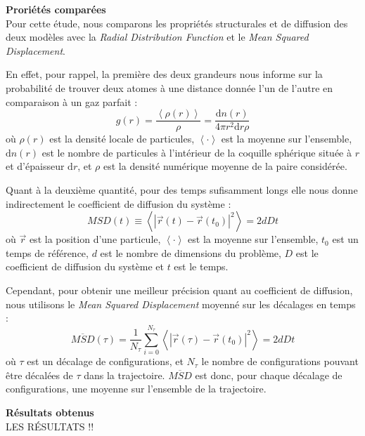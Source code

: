 \textbf{Proriétés comparées}\\
Pour cette étude, nous comparons les propriétés structurales et de diffusion des deux modèles avec la \emph{Radial Distribution Function} et le \emph{Mean Squared Displacement}.

En effet, pour rappel, la première des deux grandeurs nous informe sur la probabilité de trouver deux atomes à une distance donnée l'un de l'autre en comparaison à un gaz parfait :
\begin{equation}
    \boxed%
    {
        g (r) = \frac{\left\langle \rho (r) \right\rangle}{\rho} = \frac{\mathrm{d}n(r)}{4 \pi r^2 \mathrm{d}r \rho}
    }
    \label{eq:rdf}
\end{equation}
où $\rho (r)$ est la densité locale de particules, $\left\langle \cdot \right\rangle$ est la moyenne sur l'ensemble, $\mathrm{d}n(r)$ est le nombre de particules à l'intérieur de la coquille sphérique située à $r$ et d'épaisseur $\mathrm{d}r$, et $\rho$ est la densité numérique moyenne de la paire considérée.

Quant à la deuxième quantité, pour des temps sufisamment longs elle nous donne indirectement le coefficient de diffusion du système :
\begin{equation*}
    MSD(t) \equiv \left\langle \left| \vec{r}(t) - \vec{r}(t_0) \right|^2 \right\rangle = 2 d D t
\end{equation*}
où $\vec{r}$ est la position d'une particule, $\left\langle \cdot \right\rangle$ est la moyenne sur l'ensemble, $t_0$ est un temps de référence, $d$ est le nombre de dimensions du problème, $D$ est le coefficient de diffusion du système et $t$ est le temps.

Cependant, pour obtenir une meilleur précision quant au coefficient de diffusion, nous utilisons le \emph{Mean Squared Displacement} moyenné sur les décalages en temps :
\begin{equation}
    \boxed%
    {
        \overline{MSD} (\tau) = \frac{1}{N_{\tau}} \sum_{i = 0}^{N_{\tau}} \left\langle \left| \vec{r}(\tau) - \vec{r}(t_0) \right|^2 \right\rangle  = 2 d D t
    }
\end{equation}
où $\tau$ est un décalage de configurations, et $N_{\tau}$ le nombre de configurations pouvant être décalées de $\tau$ dans la trajectoire. $\overline{MSD}$ est donc, pour chaque décalage de configurations, une moyenne sur l'ensemble de la trajectoire.

\textbf{Résultats obtenus}\\
LES RÉSULTATS !!

